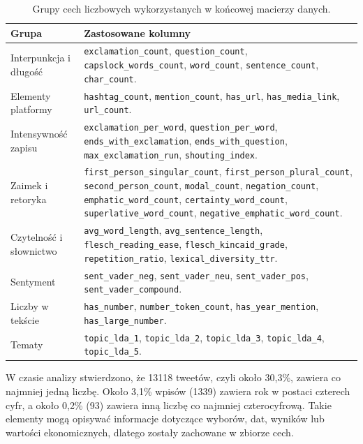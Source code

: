 \documentclass[12pt, a4paper, oneside]{scrreprt}
\begin{document}
\begin{table}[H]
\centering
\small
\caption{Grupy cech liczbowych wykorzystanych w końcowej macierzy danych.}
\label{tab:numerical-features}
\begin{tabularx}{\textwidth}{>{\raggedright\arraybackslash}p{}X}
\toprule
Grupa & Zastosowane kolumny \\
\midrule
Interpunkcja i długość & \texttt{exclamation\_count}, \texttt{question\_count}, \texttt{capslock\_words\_count}, \texttt{word\_count}, \texttt{sentence\_count}, \texttt{char\_count}. \\
Elementy platformy & \texttt{hashtag\_count}, \texttt{mention\_count}, \texttt{has\_url}, \texttt{has\_media\_link}, \texttt{url\_count}. \\
Intensywność zapisu & \texttt{exclamation\_per\_word}, \texttt{question\_per\_word}, \texttt{ends\_with\_exclamation}, \texttt{ends\_with\_question}, \texttt{max\_exclamation\_run}, \texttt{shouting\_index}. \\
Zaimek i retoryka & \texttt{first\_person\_singular\_count}, \texttt{first\_person\_plural\_count}, \texttt{second\_person\_count}, \texttt{modal\_count}, \texttt{negation\_count}, \texttt{emphatic\_word\_count}, \texttt{certainty\_word\_count}, \texttt{superlative\_word\_count}, \texttt{negative\_emphatic\_word\_count}. \\
Czytelność i słownictwo & \texttt{avg\_word\_length}, \texttt{avg\_sentence\_length}, \texttt{flesch\_reading\_ease}, \texttt{flesch\_kincaid\_grade}, \texttt{repetition\_ratio}, \texttt{lexical\_diversity\_ttr}. \\
Sentyment & \texttt{sent\_vader\_neg}, \texttt{sent\_vader\_neu}, \texttt{sent\_vader\_pos}, \texttt{sent\_vader\_compound}. \\
Liczby w tekście & \texttt{has\_number}, \texttt{number\_token\_count}, \texttt{has\_year\_mention}, \texttt{has\_large\_number}. \\
Tematy & \texttt{topic\_lda\_1}, \texttt{topic\_lda\_2}, \texttt{topic\_lda\_3}, \texttt{topic\_lda\_4}, \texttt{topic\_lda\_5}. \\
\bottomrule
\end{tabularx}
\end{table}

W czasie analizy stwierdzono, że \num{13118} tweetów, czyli około 30{,}3\%,
zawiera co najmniej jedną liczbę. Około 3{,}1\% wpisów (1339) zawiera rok w postaci czterech
cyfr, a około 0{,}2\% (93) zawiera inną liczbę co najmniej czterocyfrową.
Takie elementy mogą opisywać informacje dotyczące wyborów, dat, wyników
lub wartości ekonomicznych, dlatego zostały zachowane w zbiorze cech.
\end{document}
